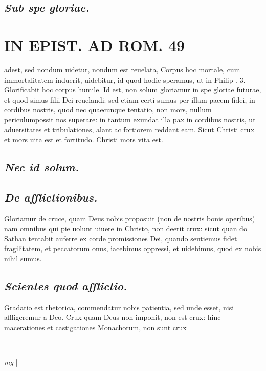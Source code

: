 \documentclass{article}
\begin{document}
\begin{pages}
\subsection*{\textit{Sub spe gloriae. }}
\section*{IN EPIST. AD ROM.  49 }
\marginpar{[ p.]}\pstart adest, sed nondum uidetur, nondum est reuelata, Corpus hoc mortale, cum immortalitatem induerit, uidebitur, id quod hodie speramus, ut in Philip . 3.  Glorificabit hoc corpus humile.   \pend\pstart Id est, non solum gloriamur in spe gloriae futurae, et quod simus filii Dei reuelandi: sed etiam certi sumus per illam pacem fidei, in cordibus nostris, quod nec quaecunque tentatio, non mors, nullum periculumpossit nos superare: in tantum exundat illa pax in cordibus nostris, ut aduersitates et tribulationes, alant ac fortiorem reddant eam. Sicut Christi crux et mors uita est et fortitudo.  Christi mors vita est.  \pend
{}
{}
\subsection*{\textit{Nec id solum. }}
{}
\subsection*{\textit{De afflictionibus. }}\pstart Gloriamur de cruce, quam Deus nobis proposuit (non de nostris bonis operibus) nam omnibus qui pie uolunt uiuere in Christo, non deerit crux: sicut quan do Sathan tentabit auferre ex corde promissiones Dei, quando sentiemus fidet fragilitatem, et peccatorum onus, iacebimus oppressi, et uidebimus, quod ex nobis nihil sumus.   \pend
{}
{}
\subsection*{\textit{Scientes quod afflictio. }}\pstart Gradatio est rhetorica, commendatur nobis patientia, sed unde esset, nisi affligeremur a Deo. Crux quam Deus non imponit, non est crux: hinc macerationes et castigationes Monachorum, non sunt crux\pend
\vspace{0.5cm}\noindent
\vspace{0.2cm}\rule{1cm}{0.2pt}\\ 
\hspace{0.2cm}\textit{mg}
\footnotesize 
\normalsize| 

\end{pages}
\end{document}
